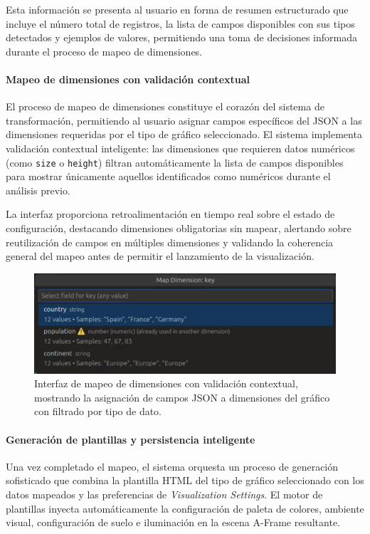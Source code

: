 \documentclass[a4paper, 12pt]{book}
\begin{document}
Esta información se presenta al usuario en forma de resumen estructurado que incluye el número total de registros, la lista de campos disponibles con sus tipos detectados y ejemplos de valores, permitiendo una toma de decisiones informada durante el proceso de mapeo de dimensiones.

\paragraph{Mapeo de dimensiones con validación contextual}
El proceso de mapeo de dimensiones constituye el corazón del sistema de transformación, permitiendo al usuario asignar campos específicos del JSON a las dimensiones requeridas por el tipo de gráfico seleccionado. El sistema implementa validación contextual inteligente: las dimensiones que requieren datos numéricos (como \texttt{size} o \texttt{height}) filtran automáticamente la lista de campos disponibles para mostrar únicamente aquellos identificados como numéricos durante el análisis previo.

La interfaz proporciona retroalimentación en tiempo real sobre el estado de configuración, destacando dimensiones obligatorias sin mapear, alertando sobre reutilización de campos en múltiples dimensiones y validando la coherencia general del mapeo antes de permitir el lanzamiento de la visualización.

\begin{figure}[H]
\centering
\includegraphics[width=0.80\linewidth]{img/ui-dimension-mapping-process.png}
\caption{Interfaz de mapeo de dimensiones con validación contextual, mostrando la asignación de campos JSON a dimensiones del gráfico con filtrado por tipo de dato.}
\label{fig:ui-dimension-mapping-process}
\end{figure}

\paragraph{Generación de plantillas y persistencia inteligente}
Una vez completado el mapeo, el sistema orquesta un proceso de generación sofisticado que combina la plantilla HTML del tipo de gráfico seleccionado con los datos mapeados y las preferencias de \emph{Visualization Settings}. El motor de plantillas inyecta automáticamente la configuración de paleta de colores, ambiente visual, configuración de suelo e iluminación en la escena A-Frame resultante.
\end{document}
